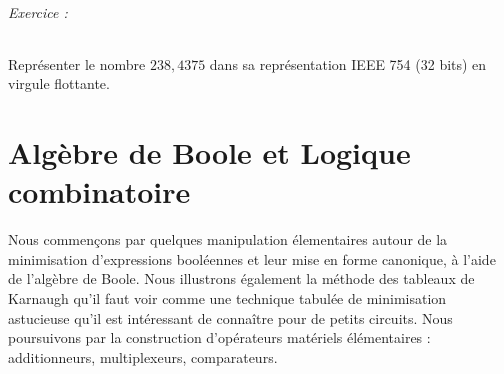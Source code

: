 \documentclass[a4paper,11pt]{article}
\newif\ifsolutions
\begin{document}
\paragraph{Exercice :} Représenter le nombre $238,4375$ dans sa représentation IEEE 754 (32 bits) en virgule flottante.

\ifsolutions
\begin{solbox}
\textbf{1. Conversion en binaire :}\\
Partie entière : $238_{10} = 128 + 64 + 32 + 8 + 4 + 2 = \mathbf{11101110_2}$\\
Partie décimale : $0,4375 = 0,25 + 0,125 + 0,0625 = 2^{-2} + 2^{-3} + 2^{-4} = \mathbf{0,0111_2}$\\
Donc : $238,4375_{10} = \mathbf{11101110,0111_2}$.

\textbf{2. Normalisation :}\\
On déplace la virgule pour obtenir un seul `1` avant la virgule :
$$ 11101110,0111_2 = 1,11011100111_2 \times 2^7 $$
L'exposant réel est $n = 7$.

\textbf{3. Codage des champs :}
\begin{itemize}
    \item \textbf{Signe ($s$) :} Le nombre est positif, donc $s = \mathbf{0}$.
    \item \textbf{Exposant ($e$) :} $e = n + 127 = 7 + 127 = 134_{10}$.\\
    $134_{10} = 128 + 4 + 2 = \mathbf{10000110_2}$.
    \item \textbf{Mantisse ($m$) :} On prend la partie fractionnaire après la virgule ($11011100111$) et on complète avec des zéros à droite pour atteindre 23 bits :\\
    $\mathbf{110\ 1110\ 0111\ 0000\ 0000\ 000_2}$.
\end{itemize}

\textbf{4. Assemblage final (32 bits) :}
\begin{lstlisting}
  S |    Exposant (8)   |          Mantisse (23)           |
  0 | 1 0 0 0 0 1 1 0 | 1 1 0 1 1 1 0 0 1 1 1 0 0 0 0 0 0 0 0 0 0 0 0 |
\end{lstlisting}
Soit en hexadécimal : $\mathbf{0x436E7000}$.
\end{solbox}
\fi

\part{Algèbre de Boole et Logique combinatoire}
Nous commençons par quelques manipulation élementaires autour de la minimisation d'expressions booléennes et leur mise en forme canonique, à l'aide de l'algèbre de Boole. Nous illustrons également la méthode des tableaux de Karnaugh qu'il faut voir comme une technique tabulée de minimisation astucieuse qu'il est intéressant de connaître pour de petits circuits. Nous poursuivons par la construction d'opérateurs matériels élémentaires : additionneurs, multiplexeurs, comparateurs.
\end{document}
